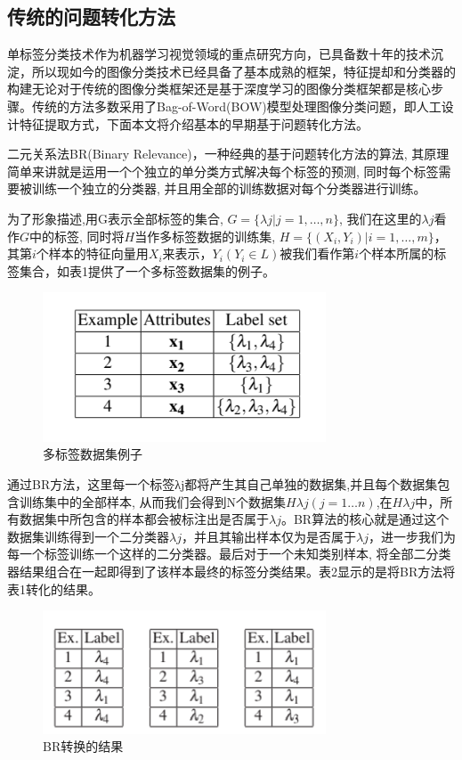 \subsection{传统的问题转化方法}
单标签分类技术作为机器学习视觉领域的重点研究方向，已具备数十年的技术沉淀，所以现如今的图像分类技术已经具备了基本成熟的框架，特征提却和分类器的构建无论对于传统的图像分类框架还是基于深度学习的图像分类框架都是核心步骤。传统的方法多数采用了Bag-of-Word(BOW)模型处理图像分类问题，即人工设计特征提取方式，下面本文将介绍基本的早期基于问题转化方法。

二元关系法BR(Binary Relevance)，一种经典的基于问题转化方法的算法, 其原理简单来讲就是运用一个个独立的单分类方式解决每个标签的预测, 同时每个标签需要被训练一个独立的分类器, 并且用全部的训练数据对每个分类器进行训练。

为了形象描述,用G表示全部标签的集合, $G=\{\lambda j|j=1, …, n\}$, 我们在这里的$\lambda j$看作$G$中的标签, 同时将$H$当作多标签数据的训练集, $H=\{ (X_i, Y_i) |i=1, …, m\}$，其第$i$个样本的特征向量用$X_i$来表示，$Y_i (Y_i\in L) $被我们看作第$i$个样本所属的标签集合，如表1提供了一个多标签数据集的例子。

\begin{figure}[htbp!]
	\centering
	\includegraphics[width=0.75\textwidth]{figures/p2-1.png}
	\caption{多标签数据集例子}\label{fig:p2-1}
	\vspace{-1em}
\end{figure}

通过BR方法，这里每一个标签λj都将产生其自己单独的数据集,并且每个数据集包含训练集中的全部样本, 从而我们会得到N个数据集$H\lambda j (j=1…n)$,在$H\lambda j$中，所有数据集中所包含的样本都会被标注出是否属于$\lambda j$。BR算法的核心就是通过这个数据集训练得到一个二分类器$\lambda j$，并且其输出样本仅为是否属于$\lambda j$，进一步我们为每一个标签训练一个这样的二分类器。最后对于一个未知类别样本, 将全部二分类器结果组合在一起即得到了该样本最终的标签分类结果。表2显示的是将BR方法将表1转化的结果。

\begin{figure}[htbp!]
	\centering
	\includegraphics[width=0.75\textwidth]{figures/p2-2.png}
	\caption{BR转换的结果}\label{fig:p2-2}
	\vspace{-1em}
\end{figure}

